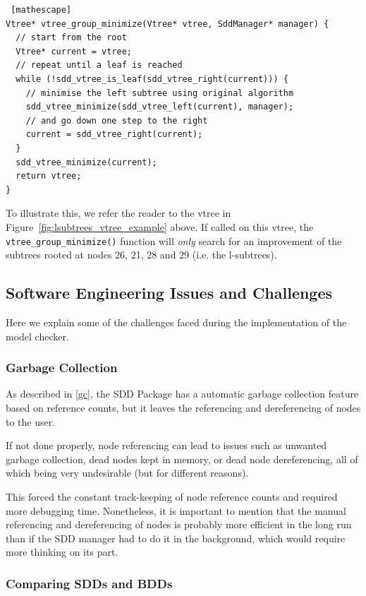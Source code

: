 \documentclass[11pt]{article}
\begin{document}
\begin{lstlisting} [mathescape]
Vtree* vtree_group_minimize(Vtree* vtree, SddManager* manager) {
  // start from the root   
  Vtree* current = vtree; 
  // repeat until a leaf is reached
  while (!sdd_vtree_is_leaf(sdd_vtree_right(current))) {
    // minimise the left subtree using original algorithm
    sdd_vtree_minimize(sdd_vtree_left(current), manager);
    // and go down one step to the right
    current = sdd_vtree_right(current);	
  }
  sdd_vtree_minimize(current);
  return vtree;
} 
\end{lstlisting}

To illustrate this, we refer the reader to the vtree in Figure~\ref{fig:lsubtrees_vtree_example} above. If called on this vtree, the \texttt{vtree\_group\_minimize()} function will \textit{only }search for an improvement of the subtrees rooted at nodes 26, 21, 28 and 29 (i.e. the l-subtrees). 

\subsection{Software Engineering Issues and Challenges}

Here we explain some of the challenges faced during the implementation of the model checker. 

\subsubsection{Garbage Collection}

As described in \ref{gc}, the SDD Package has a automatic garbage collection feature based on reference counts, but it leaves the referencing and dereferencing of nodes to the user. 

If not done properly, node referencing can lead to issues such as unwanted garbage collection, dead nodes kept in memory, or dead node dereferencing, all of which being very undesirable (but for different reasons).

This forced the constant track-keeping of node reference counts and required more debugging time. Nonetheless, it is important to mention that the manual referencing and dereferencing of nodes is probably more efficient in the long run than if the SDD manager had to do it in the background, which would require more thinking on its part.

\subsubsection{Comparing SDDs and BDDs}
\end{document}
